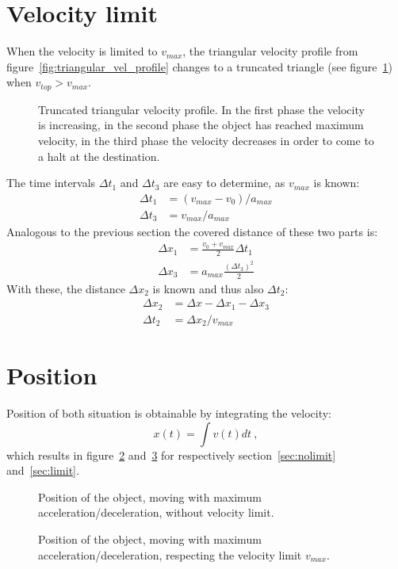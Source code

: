\documentclass{article}
\begin{document}
\section{Velocity limit\label{sec:limit}}
	When the velocity is limited to $v_{max}$, the triangular velocity profile from figure~\ref{fig:triangular_vel_profile} changes to a truncated triangle (see figure~\ref{fig:truncated_triangular_vel_profile}) when $v_{top} > v_{max}$.\\
	\begin{figure}[ht!]
		\centering
		\caption{Truncated triangular velocity profile. In the first phase the velocity is increasing, in the second phase the object has reached maximum velocity, in the third phase the velocity decreases in order to come to a halt at the destination.}
		\label{fig:truncated_triangular_vel_profile}
	\end{figure}
	The time intervals $\Delta t_1$ and $\Delta t_3$ are easy to determine, as $v_{max}$ is known:
	\begin{align}
		\Delta t_1 &= (v_{max}-v_0)/a_{max} \label{eq:dt1}\\
		\Delta t_3 &= v_{max}/a_{max}	\label{eq:dt3}
	\end{align}
	Analogous to the previous section the covered distance of these two parts is:
	\begin{align}
		\Delta x_1 &= \frac{v_0+v_{max}}{2} \Delta t_1\\
		\Delta x_3 &= a_{max}\frac{(\Delta t_3)^2}{2}
	\end{align}
	With these, the distance $\Delta x_2$ is known and thus also $\Delta t_2$:
	\begin{align}
		\Delta x_2 &= \Delta x - \Delta x_1 - \Delta x_3\\
		\Delta t_2 &= \Delta x_2 / v_{max}
	\end{align}
	
\section{Position}
	Position of both situation is obtainable by integrating the velocity:
	\begin{equation}
		x(t) = \int v(t) dt \ ,
	\end{equation}
	which results in figure~\ref{fig:position_nolimit} and~\ref{fig:position_limited} for respectively section~\ref{sec:nolimit} and~\ref{sec:limit}.
	\begin{figure}[ht!]
		\centering
		\caption{Position of the object, moving with maximum acceleration/deceleration, without velocity limit.}
		\label{fig:position_nolimit}
	\end{figure}\begin{figure}[ht!]
		\centering
		\caption{Position of the object, moving with maximum acceleration/deceleration, respecting the velocity limit $v_{max}$.}
		\label{fig:position_limited}
	\end{figure}
\end{document}
